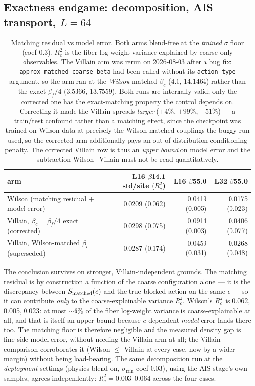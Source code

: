 \subsection{Exactness endgame: decomposition, AIS transport, $L = 64$}
\label{sec:appendix-v2-endgame}

\begin{table}[p]
  \centering
  \caption{Matching residual vs model error. Both arms blend-free at the
  \emph{trained} $\sigma$ floor (coef 0.3). $R^2_c$ is the fiber log-weight
  variance explained by coarse-only observables. The Villain arm was rerun on
  2026-08-03 after a bug fix: \texttt{approx\_matched\_coarse\_beta} had been
  called without its \texttt{action\_type} argument, so the arm ran at the
  \emph{Wilson}-matched $\beta_c$ (4.0, 14.1464) rather than the exact
  $\beta_f/4$ (3.5366, 13.7559). Both runs are internally valid; only the
  corrected one has the exact-matching property the control depends on.
  Correcting it made the Villain spreads \emph{larger} ($+4\%$, $+99\%$,
  $+51\%$) --- a train/test confound rather than a matching effect, since the
  checkpoint was trained on Wilson data at precisely the Wilson-matched
  couplings the buggy run used, so the corrected arm additionally pays an
  out-of-distribution conditioning penalty. The corrected Villain row is thus
  an \emph{upper bound} on model error and the subtraction
  Wilson${-}$Villain must not be read quantitatively.}
  \label{tab:matching-residual}
  \begin{tabular}{lrrr}
    \toprule
    arm & L16 $\beta$14.1 std/site ($R^2_c$) & L16 $\beta$55.0 &
    L32 $\beta$55.0 \\
    \midrule
    Wilson (matching residual $+$ model error) & 0.0209 (0.062) &
      0.0419 (0.005) & 0.0175 (0.023) \\
    Villain, $\beta_c = \beta_f/4$ exact (corrected) & 0.0298 (0.075) &
      0.0914 (0.003) & 0.0406 (0.077) \\
    Villain, Wilson-matched $\beta_c$ (superseded) & 0.0287 (0.174) &
      0.0459 (0.031) & 0.0268 (0.048) \\
    \bottomrule
  \end{tabular}
\end{table}

The conclusion survives on stronger, Villain-independent grounds. The matching
residual is by construction a function of the coarse configuration alone --- it
is the discrepancy between $S_{\rm matched}(c)$ and the true blocked action on
the same $c$ --- so it can contribute \emph{only} to the coarse-explainable
variance $R^2_c$. Wilson's $R^2_c$ is 0.062, 0.005, 0.023: at most ${\sim}6\%$
of the fiber log-weight variance is coarse-explainable at all, and that is
itself an upper bound because $c$-dependent \emph{model} error lands there
too. The matching floor is therefore negligible and the measured density gap
is fine-side model error, without needing the Villain arm at all; the Villain
comparison corroborates it (Wilson $\le$ Villain at every case, now by a wider
margin) without being load-bearing. The same decomposition run at the
\emph{deployment} settings (physics blend on, $\sigma_{\min}$-coef 0.03),
using the AIS stage's own samples, agrees independently:
$R^2_c = 0.003$--$0.064$ across the four cases.

